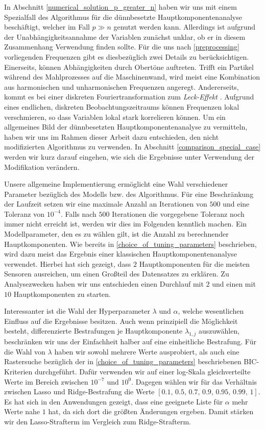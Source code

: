 In Abschnitt \ref{numerical_solution_p_greater_n} haben wir uns mit einem Spezialfall des Algorithmus für die dünnbesetzte Hauptkomponentenanalyse beschäftigt, welcher im Fall $p \gg n$ genutzt werden kann. Allerdings ist aufgrund der Unabhängigkeitsannahme der Variablen zunächst unklar, ob er in diesem Zusammenhang Verwendung finden sollte. Für die uns nach \ref{preprocessing} vorliegenden Frequenzen gibt es diesbezüglich zwei Details zu berücksichtigen. Einerseits, können Abhängigkeiten durch Obertöne auftreten. Trifft ein Partikel während des Mahlprozesses auf die Maschinenwand, wird meist eine Kombination aus harmonischen und unharmonischen Frequenzen angeregt. Andererseits, kommt es bei einer diskreten Fouriertransformation zum \textit{Leck-Effekt} \cite{kiencke}. Aufgrund eines endlichen, diskreten Beobachtungszeitraums können Frequenzen lokal verschmieren, so dass Variablen lokal stark korrelieren können. Um ein allgemeines Bild der dünnbesetzten Hauptkomponentenanalyse zu vermitteln, haben wir uns im Rahmen dieser Arbeit dazu entschieden, den nicht modifizierten Algorithmus zu verwenden. In Abschnitt \ref{comparison_special_case} werden wir kurz darauf eingehen, wie sich die Ergebnisse unter Verwendung der Modifikation verändern.

Unsere allgemeine Implementierung ermöglicht eine Wahl verschiedener Parameter bezüglich des Modells bzw. des Algorithmus. Für eine Beschränkung der Laufzeit setzen wir eine maximale Anzahl an Iterationen von $500$ und eine Toleranz von $10^{-4}$. Falls nach $500$ Iterationen die vorgegebene Toleranz noch immer nicht erreicht ist, werden wir dies im Folgenden kenntlich machen. Ein Modellparameter, den es zu wählen gilt, ist die Anzahl zu berechnender Hauptkomponenten. Wie bereits in \ref{choice_of_tuning_parameters} beschrieben, wird dazu meist das Ergebnis einer klassischen Hauptkomponentenanalyse verwendet. Hierbei hat sich gezeigt, dass $2$ Hauptkomponenten für die meisten Sensoren ausreichen, um einen Großteil des Datensatzes zu erklären. Zu Analysezwecken haben wir uns entschieden einen Durchlauf mit $2$ und einen mit $10$ Hauptkomponenten zu starten. 

Interessanter ist die Wahl der Hyperparameter $\lambda$ und $\alpha$, welche wesentlichen Einfluss auf die Ergebnisse besitzen. Auch wenn prinzipiell die Möglichkeit besteht, differenzierte Bestrafungen je Hauptkomponente $\lambda_{1,j}$ auszuwählen, beschränken wir uns der Einfachheit halber auf eine einheitliche Bestrafung. Für die Wahl von $\lambda$ haben wir sowohl mehrere Werte ausprobiert, als auch eine Rastersuche bezüglich der in \ref{choice_of_tuning_parameters} beschriebenen BIC-Kriterien durchgeführt. Dafür verwenden wir auf einer log-Skala gleichverteilte Werte im Bereich zwischen $10^{-7}$ und $10^0$. Dagegen wählen wir für das Verhältnis zwischen Lasso und Ridge-Bestrafung die Werte $[0.1,\, 0.5,\, 0.7,\, 0.9,\, 0.95,\, 0.99,\, 1]$. Es hat sich in den Anwendungen gezeigt, dass eine geeignete Liste für $\alpha$ mehr Werte nahe $1$ hat, da sich dort die größten Änderungen ergeben. Damit stärken wir den Lasso-Strafterm im Vergleich zum Ridge-Strafterm.  


